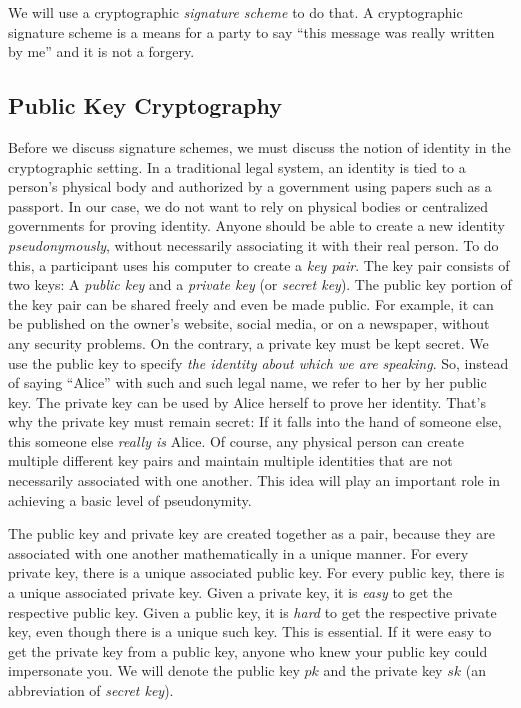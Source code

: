 We will use a cryptographic \emph{signature scheme} to do that. A cryptographic signature
scheme is a means for a party to say ``this message was really written by me'' and it is
not a forgery.

\subsection*{Public Key Cryptography}

Before we discuss signature schemes, we must discuss the notion of identity in the cryptographic
setting. In a traditional legal system, an identity is tied to a person's physical body
and authorized by a government using papers such as a passport. In our case, we do not want
to rely on physical bodies or centralized governments for proving identity. Anyone should be
able to create a new identity \emph{pseudonymously}, without necessarily associating it with
their real person. To do this, a participant uses his computer to create a \emph{key pair}.
The key pair consists of two keys: A \emph{public key} and a \emph{private key}
(or \emph{secret key}). The public key portion of the key pair can be shared freely and even
be made public. For example, it can be published on the owner's website, social media, or on
a newspaper, without any security problems. On the contrary, a private key must be kept secret.
We use the public key to specify \emph{the identity about which we are speaking}. So, instead
of saying ``Alice'' with such and such legal name, we refer to her by her public
key. The private key can be used by Alice herself to prove her identity. That's why the
private key must remain secret: If it falls into the hand of someone else, this someone
else \emph{really is} Alice. Of course, any physical person can create multiple different
key pairs and maintain multiple identities that are not necessarily associated with one
another. This idea will play an important role in achieving a basic level of pseudonymity.

The public key and private key are created together as a pair, because they are associated
with one another mathematically in a unique manner. For every private key, there is a unique
associated public key. For every public key, there is a unique associated private key.
Given a private key, it is \emph{easy} to get the respective public key. Given a public
key, it is \emph{hard} to get the respective private key, even though there is a unique
such key. This is essential. If it were easy to get the private key from a public key,
anyone who knew your public key could impersonate you. We will denote the public key
$pk$ and the private key $sk$ (an abbreviation of \emph{secret key}).

